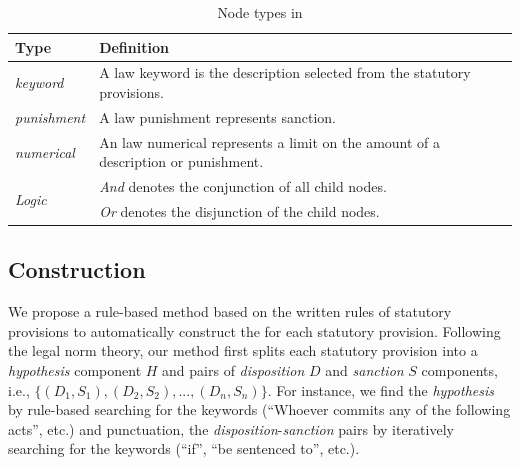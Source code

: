 


\begin{table}
    \centering
    \small
    \begin{tabular}{p{}p{}}
    \toprule
        Type & Definition\\
        \hline
        \textit{keyword} & A law keyword is the description selected from the statutory provisions.\\
        \hline
        \textit{punishment} & A law punishment represents sanction.\\
        \hline
        \textit{numerical} & An law numerical represents a limit on the amount of a description or punishment.\\
        \hline
        \multirow{2}{*}{\textit{Logic}} & \textit{And} denotes the conjunction of all child nodes.\\
        \cline{2-2}
        & \textit{Or} denotes the disjunction of the child nodes.\\
        \bottomrule
    \end{tabular}
    \caption{Node types in \lawgraph{}}
    \label{tab:L_node_t}
    \vspace{-1.5em}
\end{table}




\subsection{\lawgraph{} Construction}

We propose a rule-based method based on the written rules of statutory provisions to automatically construct the \lawgraph{} for each statutory provision. Following the legal norm theory, our method first splits each statutory provision into a \textit{hypothesis} component $H$ and pairs of \textit{disposition} $D$ and \textit{sanction} $S$ components, i.e., $\{(D_1, S_1), (D_2, S_2), ..., (D_n, S_n)\}$. For instance, we find the \textit{hypothesis} by rule-based searching for the keywords (``Whoever commits any of the following acts'', etc.) and punctuation, the \textit{disposition}-\textit{sanction} pairs by iteratively searching for the keywords (``if'', ``be sentenced to'', etc.).

